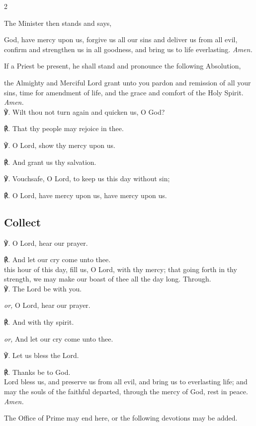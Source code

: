 \begin{multicols}{2}
\begin{rubric}
	The Minister then stands and says,
\end{rubric}

 God, have mercy upon us, forgive us all our sins and deliver us from all evil, confirm and strengthen us in all goodness, and bring us to life everlasting. \textit{Amen.}

\begin{rubric}
	If a Priest be present, he shall stand and pronounce the following Absolution,
\end{rubric}

 the Almighty and Merciful Lord grant unto you pardon {} and remission of all your sins, time for amendment of life, and the grace and comfort of the Holy Spirit. \textit{Amen.}\\

℣. Wilt thou not turn again and quicken us, O God?

℟. That thy people may rejoice in thee.

℣. O Lord, show thy mercy upon us.

℟. And grant us thy salvation.

℣. Vouchsafe, O Lord, to keep us this day without sin;

℟. O Lord, have mercy upon us, have mercy upon us.

\subsection{Collect}
℣. O Lord, hear our prayer.

℟. And let our cry come unto thee.\\

 this hour of this day, fill us, O Lord, with thy mercy; that going forth in thy strength, we may make our boast of thee all the day long. Through.\\

℣. The Lord be with you.\par
\textit{or,} O Lord, hear our prayer.

℟. And with thy spirit.\par
\textit{or,} And let our cry come unto thee.

℣. Let us bless the Lord.

℟. Thanks be to God.\\

 Lord bless us, and preserve us from all evil, and bring us to everlasting life; and may the souls {} of the faithful departed, through the mercy of God, rest in peace. \textit{Amen.}


\begin{rubric}
	The Office of Prime may end here, or the following devotions may be added.
\end{rubric}
\end{multicols}